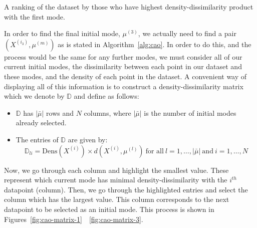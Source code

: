 \begin{example}
    \begin{table}[H]
        \singlespacing{%
        \resizebox{\textwidth}{!}{%
            
        }}
        \caption{A ranking of the dataset by those who have highest
            density-dissimilarity product with the first
            mode.}\label{tab:ranked-dens-dissim}
    \end{table}

    In order to find the final initial mode, \(\mu^{(3)}\), we actually need to
    find a pair \((X^{(i_3)}, \mu^{(m)})\) as is stated in 
    Algorithm~\ref{alg:cao}. In order to do this, and the process would be the
    same for any further modes, we must consider all of our current initial
    modes, the dissimilarity between each point in our dataset and these modes,
    and the density of each point in the dataset. A convenient way of displaying
    all of this information is to construct a density-dissimilarity matrix which
    we denote by \(\mathbb{D}\) and define as follows:
    \begin{itemize}
        \item \(\mathbb{D}\) has \(|\bar{\mu}|\) rows and \(N\) columns, where
            \(|\bar{\mu}|\) is the number of initial modes already selected.
        \item The entries of \(\mathbb{D}\) are given by:
            \[
                \mathbb{D}_{li} = \text{Dens}(X^{(i)}) \times d(X^{(i)},
                \mu^{(l)}) \ \text{for all} \ l = 1, \ldots, |\bar{\mu}| \
                \text{and} \ i = 1, \ldots, N
            \]
    \end{itemize}

    Now, we go through each column and highlight the smallest value. These
    represent which current mode has minimal density-dissimilarity with the
    \(i^{th}\) datapoint (column). Then, we go through the highlighted entries
    and select the column which has the largest value. This column corresponds
    to the next datapoint to be selected as an initial mode. This process is
    shown in Figures~\ref{fig:cao-matrix-1}~\-~\ref{fig:cao-matrix-3}.
    
    \begin{figure}[H]
        \centering
\end{figure}
\end{example}
